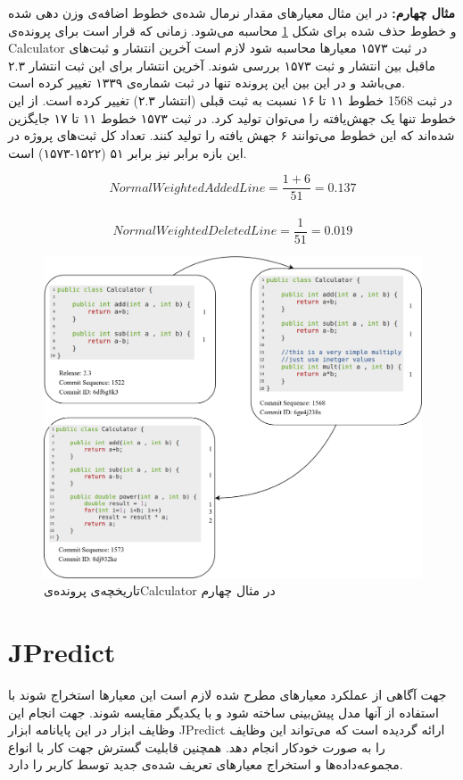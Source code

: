  
\textbf{مثال چهارم:}
در این مثال معیار‌های مقدار نرمال شده‌ی خطوط اضافه‌ی وزن دهی شده و خطوط حذف شده برای شکل \ref{fig:example3} محاسبه می‌شود. زمانی که قرار است برای پرونده‌ی Calculator  در ثبت ۱۵۷۳ معیارها محاسبه شود لازم است آخرین انتشار و ثبت‌های ماقبل بین انتشار و ثبت ۱۵۷۳ بررسی شوند. آخرین انتشار برای این ثبت انتشار ۲.۳ می‌باشد و  در این بین این پرونده تنها در ثبت شماره‌ی ۱۳۳۹ تغییر کرده است. \\
در ثبت 1568 خطوط ۱۱ تا ۱۶ نسبت به ثبت قبلی (انتشار ۲.۳) تغییر کرده است. از این خطوط تنها یک جهش‌یافته را می‌توان تولید کرد. در ثبت ۱۵۷۳ خطوط ۱۱ تا ۱۷ جایگزین شده‌اند که این خطوط می‌توانند ۶ جهش یافته را تولید کنند. تعداد کل ثبت‌های پروژه در این بازه  برابر نیز برابر ۵۱ 
(۱۵۲۲-۱۵۷۳) 
است. 
\begin{latin}
\[
NormalWeightedAddedLine = \frac{1+6}{51} = 0.137\]\\
\[
NormalWeightedDeletedLine = \frac{1}{51} = 0.019
\]
\end{latin}



\begin{figure}[H]
	\centering
	\includegraphics[width=1\textwidth]{img/method/example3.png}
	\caption{ تاریخچه‌ی پرونده‌یCalculator در مثال چهارم}
	\label{fig:example3}
\end{figure}

\section{JPredict}
جهت آگاهی از عملکرد معیارهای مطرح شده لازم است این معیارها استخراج شوند با استفاده از آنها مدل پیش‌بینی ساخته شود و با یکدیگر مقایسه شوند. جهت انجام این وظایف ابزار  در این پایانامه ابزار JPredict ارائه گردیده است که می‌تواند این وظایف را به صورت خودکار انجام دهد. همچنین قابلیت گسترش جهت کار با انواع مجموعه‌داده‌ها و استخراج معیارهای تعریف شده‌ی جدید توسط کاربر را دارد. 

